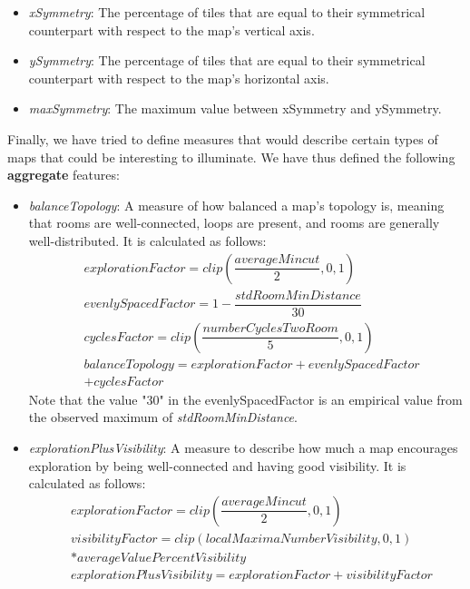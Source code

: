 \begin{itemize}
    \item \textit{xSymmetry}: The percentage of tiles that are equal to their symmetrical counterpart with respect to the map's vertical axis.
    \item \textit{ySymmetry}: The percentage of tiles that are equal to their symmetrical counterpart with respect to the map's horizontal axis.
    \item \textit{maxSymmetry}: The maximum value between xSymmetry and ySymmetry.
\end{itemize}

Finally, we have tried to define measures that would describe certain types of maps that could be interesting to illuminate. We have thus defined the following \textbf{aggregate} features:

\begin{itemize}
    \item \textit{balanceTopology}: A measure of how balanced a map's topology is, meaning that rooms are well-connected, loops are present, and rooms are generally well-distributed. It is calculated as follows:
    \begin{equation}
    \begin{split}
        &explorationFactor = clip\left(\dfrac{averageMincut}{2}, 0, 1\right) \\
        &evenlySpacedFactor = 1 - \dfrac{stdRoomMinDistance}{30} \\
        &cyclesFactor = clip\left(\dfrac{numberCyclesTwoRoom}{5}, 0, 1\right) \\
        &balanceTopology = explorationFactor + evenlySpacedFactor \\
        &+ cyclesFactor
    \end{split}
    \end{equation}
    Note that the value "30" in the evenlySpacedFactor is an empirical value from the observed maximum of \textit{stdRoomMinDistance}.
    \item \textit{explorationPlusVisibility}: A measure to describe how much a map encourages exploration by being well-connected and having good visibility. It is calculated as follows:
    \begin{equation}
    \begin{split}
        &explorationFactor = clip\left(\dfrac{averageMincut}{2}, 0, 1\right) \\
        &visibilityFactor = clip\left(localMaximaNumberVisibility, 0, 1\right)\\ 
        &* averageValuePercentVisibility \\
        &explorationPlusVisibility = explorationFactor + visibilityFactor
    \end{split}
    \end{equation}
\end{itemize}

